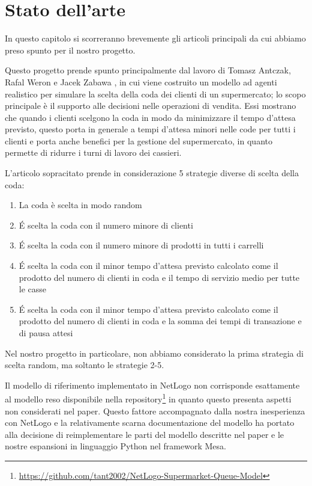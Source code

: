 \chapter{Stato dell'arte}
\label{chapter:sota}

In questo capitolo si scorreranno brevemente gli articoli principali da cui abbiamo preso spunto per il nostro progetto. 

\vspace*{1\baselineskip}

Questo progetto prende spunto principalmente dal lavoro di Tomasz Antczak, Rafal Weron e Jacek Zabawa \cite{article1}, in cui viene costruito un modello ad agenti realistico per simulare la scelta della coda dei clienti di un supermercato; lo scopo principale è il supporto alle decisioni nelle operazioni di vendita. Essi mostrano che quando i clienti scelgono la coda in modo da minimizzare il tempo d'attesa previsto, questo porta in generale a tempi d'attesa minori nelle code per tutti i clienti e porta anche benefici per la gestione del supermercato, in quanto permette di ridurre i turni di lavoro dei cassieri.

L'articolo sopracitato prende in considerazione 5 strategie diverse di scelta della coda:

\begin{enumerate}
	\item La coda è scelta in modo random
	\item \'E scelta la coda con il numero minore di clienti
	\item \'E scelta la coda con il numero minore di prodotti in tutti i carrelli
	\item \'E scelta la coda con il minor tempo d'attesa previsto calcolato come il prodotto del numero di clienti in coda e il tempo di servizio medio per tutte le casse
	\item \'E scelta la coda con il minor tempo d'attesa previsto calcolato come il prodotto del numero di clienti in coda e la somma dei tempi di transazione e di pausa attesi
\end{enumerate}

Nel nostro progetto in particolare, non abbiamo considerato la prima
strategia di scelta random, ma soltanto le strategie 2-5.

Il modello di riferimento \cite{article1} implementato in NetLogo non
corrisponde esattamente al modello reso disponibile nella repository\footnote{\protect\url{https://github.com/tant2002/NetLogo-Supermarket-Queue-Model}} in
quanto questo presenta aspetti non considerati nel paper. Questo
fattore accompagnato dalla nostra inesperienza con NetLogo e la
relativamente scarna documentazione del modello ha portato alla
decisione di reimplementare le parti del modello descritte nel paper
\cite{article1} e le nostre espansioni in linguaggio Python nel
framework Mesa.

